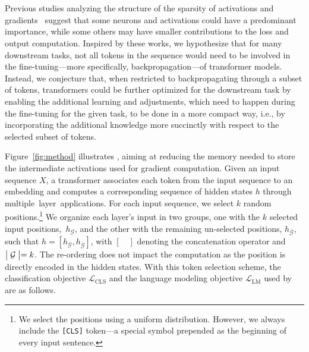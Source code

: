 \section{\method}  \label{sec:method}

Previous studies analyzing the structure of the sparsity of activations and gradients~\citep{DBLP:conf/icml/KurtzKGMCGLMSA20,DBLP:conf/icml/LiuWDZY0S0TRC23, DBLP:conf/acl/DaiDHSCW22}
suggest that some neurons and activations could have a predominant importance, while some others may have smaller contributions to the loss and output computation.
Inspired by these works, we hypothesize that for many downstream tasks, 
not all tokens in the sequence would need to be involved in the fine-tuning---more specifically, backpropagation---of transformer models.
Instead, we conjecture that, when restricted to backpropagating through a subset of tokens, 
transformers could be further optimized for the downstream task 
by enabling the additional learning and adjustments, which need to happen during the fine-tuning for the given task, 
to be done in a more compact way, i.e., by incorporating the additional knowledge more succinctly with respect to the selected subset of tokens.




Figure~\ref{fig:method} illustrates \method, aiming at reducing the memory needed to store the intermediate activations used for gradient computation. Given an input sequence $X$, a transformer associates each token from the input sequence to an embedding and computes a corresponding sequence of hidden states $h$ through multiple~layer~applications.
For each input sequence, we select $k$ random positions.\footnote{We select the positions using a uniform distribution. However, we always include the \texttt{[CLS]} token---a special symbol prepended as the beginning of every input sentence.} We organize each layer's input in two groups, 
one with the $k$ selected input positions,~$h_{\mathcal{G}}$, and the other with the remaining un-selected positions, $h_{\bar{\mathcal{G}}}$, such that $h = [ h_{\mathcal{G}}, h_{\bar{\mathcal{G}}}]$, with $[\quad]$ denoting the concatenation operator and $\bigm|\mathcal{G}\bigm|=k$. The re-ordering does not impact the computation as the position is directly encoded in the hidden states. 
With this token selection scheme, the classification objective $\mathcal{L}_{\text{CLS}}$ and the language modeling objective $\mathcal{L}_{\text{LM}}$ used by \method are as follows.


